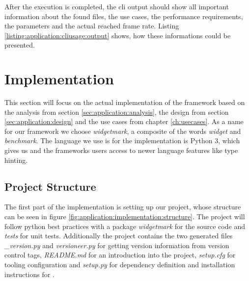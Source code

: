 

After the execution is completed, the \gls{cli} output should show all
important information about the found files, the use cases, the performance
requirements, the parameters and the actual reached frame rate. Listing
\ref{listing:application:cliusage:output} shows, how these informations could be
presented.





\section{Implementation} \label{sec:application:implementation}

This section will focus on the actual implementation of the framework based on
the analysis from section \ref{sec:application:analysis}, the design from
section \ref{sec:application:design} and the use cases from chapter
\ref{ch:usecases}. As a name for our framework we choose \emph{widgetmark}, a
composite of the words \emph{widget} and \emph{benchmark}. The language we use
is for the implementation is Python 3, which gives us and the frameworks users
access to newer language features like type hinting.

\subsection{Project Structure}

The first part of the implementation is setting up our project, whose structure
can be seen in figure \ref{fig:application:implementation:structure}. The
project will follow python best practices with a package \emph{widgetmark} for
the source code and \emph{tests} for unit tests. Additionally the project
contains the two generated files \emph{\_version.py} and \emph{versioneer.py}
for getting version information from version control tags, \emph{README.md} for
an introduction into the project, \emph{setup.cfg} for tooling configuration and
\emph{setup.py} for dependency definition and installation instructions for
.

